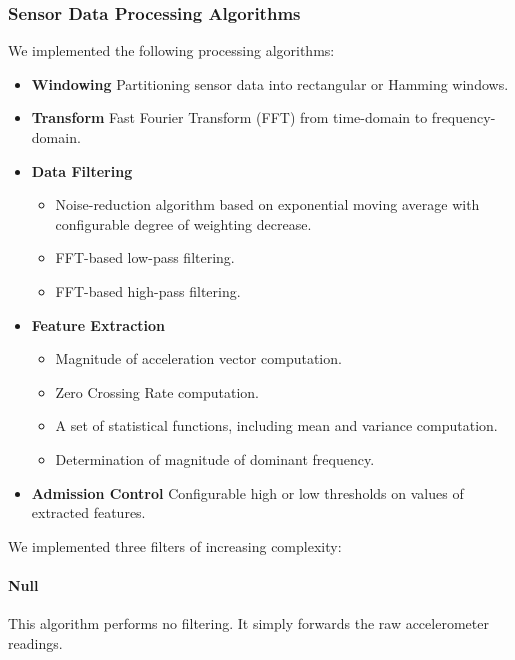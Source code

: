 \subsubsection{Sensor Data Processing Algorithms}
\label{sec:sensorDataAlgorithms}

We implemented the following processing algorithms:

\begin{itemize}

	\item {\bf Windowing} Partitioning sensor data into rectangular or Hamming windows.
		
	\item {\bf Transform} Fast Fourier Transform (FFT) from time-domain to frequency-domain.
	  
	\item {\bf Data Filtering} 
		\begin{itemize}
			\item Noise-reduction algorithm based on exponential moving average with 
	  configurable degree of weighting decrease.
			\item FFT-based low-pass filtering.
			\item FFT-based high-pass filtering.
		\end{itemize}

	\item {\bf Feature Extraction} 
		\begin{itemize}
			\item Magnitude of acceleration vector computation.
			\item Zero Crossing Rate computation.
			\item A set of statistical functions, including mean and variance computation.
			\item Determination of magnitude of dominant frequency.
		\end{itemize}

	\item {\bf Admission Control} Configurable high or low thresholds on values of extracted features.
  
\end{itemize}

\iffalse
We implemented three filters of increasing complexity:

  \paragraph{Null} This algorithm performs no filtering.  It simply
  forwards the raw accelerometer readings.


